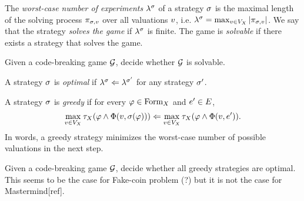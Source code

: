 The \emph{worst-case number of experiments} $\lambda^{\sigma}$
  of a strategy $\sigma$ is the maximal length of the solving process
  $\pi_{\sigma,v}$ over all valuations $v$, i.e.
  $\lambda^{\sigma} = \max_{v\in V_X} |\pi_{\sigma,v}|$.
We say that the strategy \emph{solves the game} if $\lambda^{\sigma}$ is finite.
The game is \emph{solvable} if there exists a strategy that solves the game.

\begin{problem}
Given a code-breaking game $\mathcal{G}$, decide whether $\mathcal{G}$ is solvable.
\end{problem}

\begin{definition}
A strategy $\sigma$ is \emph{optimal} if
  $\lambda^{\sigma} <= \lambda^{\sigma'}$ for any strategy $\sigma'$.

A strategy $\sigma$ is \emph{greedy} if
  for every $\varphi\in\textrm{Form}_X$ and $e'\in E$,
\[
\max_{v\in V_X} \tau_X(\varphi \wedge \Phi(v, \sigma(\varphi))) <=
\max_{v\in V_X} \tau_X(\varphi \wedge \Phi(v, e')).
\]
In words, a greedy strategy minimizes
  the worst-case number of possible valuations in the next step.
\end{definition}

\begin{problem}
Given a code-breaking game $\mathcal{G}$,
  decide whether all greedy strategies are optimal.
This seems to be the case for Fake-coin problem (?)
  but it is not the case for Mastermind[ref].
\end{problem}


